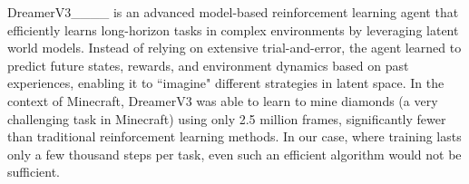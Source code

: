 DreamerV3____ is an advanced model-based reinforcement learning agent that efficiently learns long-horizon tasks in complex environments by leveraging latent world models. Instead of relying on extensive trial-and-error, the agent learned to predict future states, rewards, and environment dynamics based on past experiences, enabling it to ``imagine" different strategies in latent space. In the context of Minecraft, DreamerV3 was able to learn to mine diamonds (a very challenging task in Minecraft) using only 2.5 million frames, significantly fewer than traditional reinforcement learning methods.
In our case, where training lasts only a few thousand steps per task, even such an efficient algorithm would not be sufficient.